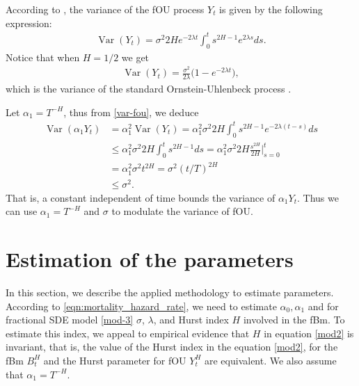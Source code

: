 \documentclass[smallextended]{svjour3}
\DeclareMathOperator{\Var}{Var}
\begin{document}
        According to \cite{ze-ch-ya}, the variance of the fOU process $Y_t$ is 
    given by the following expression:
    \begin{align}
        \Var(Y_t)= 
            \sigma^2 2H e^{-2\lambda t} 
            \int_0^t s^{2H-1} e^{2\lambda s} ds.\label{var-fou}
    \end{align}
    Notice that when $H=1/2$ we get
    \begin{align}
        \Var(Y_t)= \frac{\sigma^2}{2\lambda}  \big(1-e^{-2\lambda t}\big),
    \end{align}
    which is the variance of the standard Ornstein-Uhlenbeck process 
   \citep[see][p. 143]{mik}. 

    Let $\alpha_1 = T^{-H}$, thus from \cref{var-fou}, we deduce
    \begin{equation} \label{var-fou1}
        \begin{aligned}
            \Var(\alpha_1 Y_t)
                & = 
                    \alpha_1 ^2 
                    \Var(Y_t)= \alpha_1^2 \sigma ^ 2 2H  
                    \int_0^t
                        s^{2H - 1} 
                        e^{-2 \lambda (t - s)} 
                    ds
                \\
                & \le 
                    \alpha_1 ^ 2 
                    \sigma^2 2H  
                    \int_0^t
                         s^{2H-1} ds
                     = \alpha_1^2 \sigma^2 2H
                    \frac{s^{2H}}{2H}
                    \Big|_{s=0}^t 
                \\
                & = 
                    \alpha_1 ^ 2 
                    \sigma ^ 2 t ^ {2H} 
                    = \sigma ^ 2 (t / T) ^ {2H}
                \\
                & \leq
                \sigma^2 .
        \end{aligned}
    \end{equation}
    That is, a constant independent of time bounds the variance of
    $\alpha_1 Y_t$. Thus we can use $\alpha_1 = T^ {-H}$ and $\sigma$ to 
    modulate the variance of fOU.
%
\section{Estimation of the parameters}
    \label{esti}
        In this section, we describe the applied methodology to estimate 
        parameters. According to \eqref{eqn:mortality_hazard_rate}, we need to 
    estimate $\alpha_0, \alpha_1$ and for fractional SDE model \eqref{mod-3}
    $\sigma$, $\lambda$, and Hurst index $H$ involved in the fBm. 
    To estimate this index, we appeal to empirical evidence that $H$ in 
    equation \eqref{mod2} is invariant, that is, the  value of the
    Hurst index in the equation \eqref{mod2}, for the fBm $B_t^H$ and
    the Hurst parameter for fOU $Y_t^H$ are equivalent. 
    We also assume that $\alpha_1=T^{-H}$.
\end{document}
